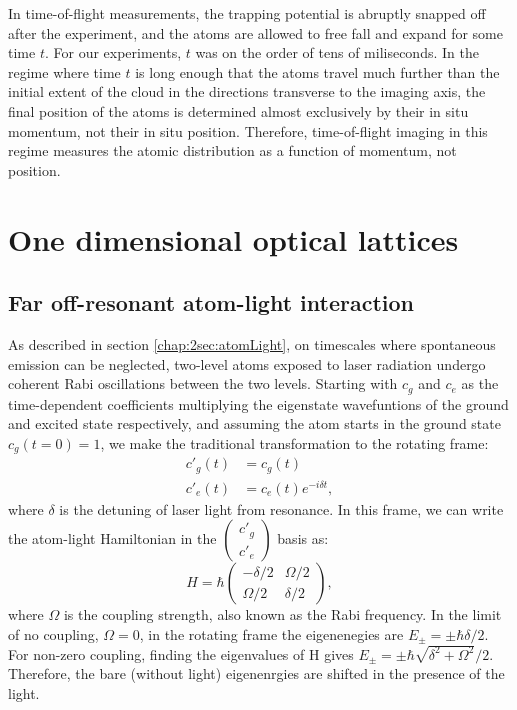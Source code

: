 In time-of-flight measurements, the trapping potential is abruptly snapped off after the experiment, and the atoms are allowed to free fall and expand for some time $t$. For our experiments, $t$ was on the order of tens of miliseconds. In the regime where time $t$ is long enough that the atoms travel much further than the initial extent of the cloud in the directions transverse to the imaging axis, the final position of the atoms is determined almost exclusively by their in situ momentum, not their in situ position. Therefore, time-of-flight imaging in this regime measures the atomic distribution as a function of momentum, not position.  


\section{One dimensional optical lattices}\label{chap:4sec:1DOL}


\subsection{Far off-resonant atom-light interaction}
	As described in section \ref{chap:2sec:atomLight}, on timescales where spontaneous emission can be neglected, two-level atoms exposed to laser radiation undergo coherent Rabi oscillations between the two levels. Starting with $c_g$ and $c_e$ as the time-dependent coefficients multiplying the eigenstate wavefuntions of the ground and excited state respectively, and assuming the atom starts in the ground state $c_g(t=0)=1$, we make the traditional transformation to the rotating frame:
\begin{align}
c'_g(t) & = c_g(t)\\
c'_e(t) & = c_e(t) e^{-i\delta t}, 
\end{align}
where $\delta$ is the detuning of laser light from resonance. In this frame, we can write the atom-light Hamiltonian in the $\begin{pmatrix} c'_g \\ c'_e \end{pmatrix}$ basis as:
\begin{equation}
H = \hbar \begin{pmatrix} -\delta/2 & \Omega/2 \\ \Omega/2 & \delta/2 \end{pmatrix},
\end{equation}
where $\Omega$ is the coupling strength, also known as the Rabi frequency. In the limit of no coupling, $\Omega = 0$, in the rotating frame the eigenenegies are $E_{\pm} = \pm \hbar \delta/2$. For non-zero coupling, finding the eigenvalues of H gives $E_{\pm} = \pm \hbar \sqrt{\delta^2 + \Omega^2}/2$. Therefore, the bare (without light) eigenenrgies are shifted in the presence of the light. 

